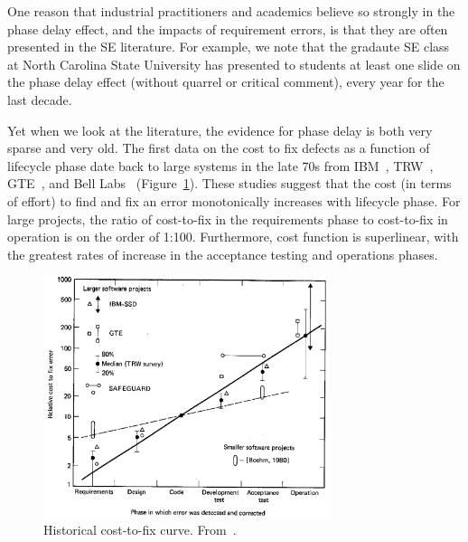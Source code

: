 One reason that industrial practitioners and academics believe so strongly in the phase delay effect,
and the impacts of requirement errors, is that they are often presented in the SE literature. For example,
we note that the gradaute SE class at North Carolina State University has presented to students at
least one  slide on the phase delay
effect (without quarrel or critical comment), every year for the last decade.

Yet when we look at the literature, the evidence for phase delay is both very sparse and very old.
The first data on the cost to fix defects as a function of lifecycle phase date back to large systems in the late 70s from IBM~\cite{Fagan76}, TRW~\cite{Boehm76}, GTE~\cite{Daly77}, and Bell Labs~\cite{Stephenson76} (Figure~\ref{fig:cost-to-fix}). These studies suggest that the cost (in terms of effort) to find and fix an error monotonically increases with lifecycle phase. For large projects, the ratio of cost-to-fix in the requirements phase to cost-to-fix in operation is on the order of 1:100. Furthermore, cost function is superlinear, with the greatest rates of increase in the acceptance testing and operations phases.

\begin{figure}[!ht]
 \includegraphics[width=3.3in]{img/boehm_cost-to-fix.png}
 \caption{Historical cost-to-fix curve. From~\cite{Boehm81}.}\label{fig:cost-to-fix}
 \end{figure}
 
